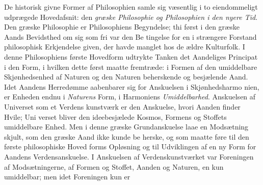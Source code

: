 \documentclass[12pt,a4paper]{book}
\begin{document}
De historisk givne Former af Philosophien samle sig
væsentlig i to eiendommeligt udprægede Hovedafsnit: den
\emph{græske Philosophie og Philosophien i den nyere Tid}.
Den græske Philosophie er Philosophiens Begyndelse; thi først
i den græske Aands Bevidsthed om sig som fri var den Be\-%
tingelse for en i strængere Forstand philosophisk Erkjendelse
given, der havde manglet hos de ældre Kulturfolk. I denne
Philosophiens første Hovedform udtrykte Tanken det Aandeliges
Principat i den Form, i hvilken dette først maatte fremtræde:
i Formen af den umiddelbare Skjønhedsenhed af Naturen og
den Naturen beherskende og besjælende Aand. Idet Aandens
Herredømme aabenbarer sig for Anskuelsen i Skjønhedsharmo\-%
nien, er Enheden endnu i \emph{Naturens} Form, i Harmoniens
\emph{Umiddelbarhed}. Anskuelsen af Universet som et Verdens\-%
kunstværk er den Anskuelse, hvori Aanden finder Hvile; Uni\-%
verset bliver den ideebesjælede Kosmos, Formens og Stoffets
umiddelbare Enhed. Men i denne græske Grundanskuelse laae
en Modsætning skjult, som den græske Aand ikke kunde be\-%
herske, og som maatte føre til den første philosophiske Hoved\-%
forms Opløsning og til Udviklingen af en ny Form for Aandens
Verdensanskuelse. I Anskuelsen af Verdenskunstværket var
Foreningen af Modsætningerne, af Formen og Stoffet, Aanden
og Naturen, en kun umiddelbar; men idet Foreningen kun er
\end{document}
